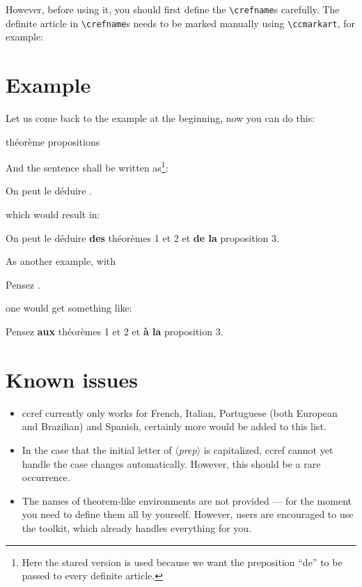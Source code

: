 \documentclass[classical]{einfart}
\providecommand{\meta}[1]{$\langle${\normalfont\itshape#1}$\rangle$}
\newenvironment{demo}{%
    \LocallyStopLineNumbers%
    \begin{tcolorbox}[enhanced jigsaw,pad at break*=1mm,breakable,
        left=4mm,right=4mm,top=1mm,bottom=1mm,
        colback=gray!5!paper,boxrule=0pt,frame hidden,
        borderline west={1.5mm}{0mm}{gray!55!paper},arc=.7mm]%
}{\end{tcolorbox}\ResumeLineNumbers}
\newcommand{\ccrefpackage}{\textsf{ccref}}
\begin{document}
However, before using it, you should first define the \lstinline|\crefname|s carefully. The definite article in \lstinline|\crefname|s needs to be marked manually using \lstinline|\ccmarkart|, for example:

\begin{code}
\end{code}


\section{Example}

Let us come back to the example at the beginning, now you can do this:

\begin{code}
                  { théorème}
                      { propositions}
\end{code}

And the sentence shall be written as\footnote{Here the stared version is used because we want the preposition ``de'' to be passed to every definite article.}:

\begin{code}
On peut le déduire .
\end{code}

which would result in:

\begin{demo}
    On peut le déduire \textbf{des} théorèmes 1 et 2 et \textbf{de la} proposition 3.
\end{demo}

As another example, with

\begin{code}
Pensez .
\end{code}

one would get something like:

\begin{demo}
    Pensez \textbf{aux} théorèmes 1 et 2 et \textbf{à la} proposition 3.
\end{demo}



\section{Known issues}
\begin{itemize}
    \item \ccrefpackage{} currently only works for French, Italian, Portuguese (both European and Brazilian) and Spanish, certainly more would be added to this list.
    \item In the case that the initial letter of \meta{prep} is capitalized, \ccrefpackage{} cannot yet handle the case changes automatically. However, this should be a rare occurrence.
    \item The names of theorem-like environments are not provided --- for the moment you need to define them all by yourself. However, users are encouraged to use the \ProjLib{} toolkit, which already handles everything for you.
\end{itemize}
\end{document}
